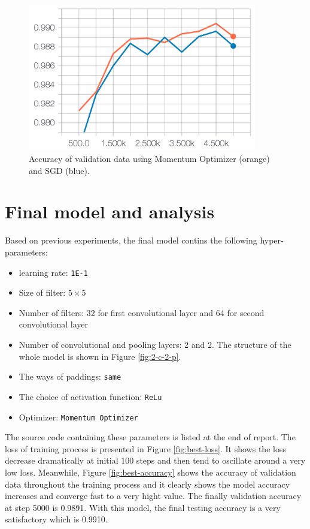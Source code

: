 \documentclass[11pt]{article}
\begin{document}
\begin{figure}[!htb]
   \centering
   \includegraphics[width=10cm]{images/optimizer-accuracy.png} %
   \caption{Accuracy of validation data using Momentum Optimizer (orange) and SGD (blue).}
   \label{fig:momentum-accuracy}
\end{figure}

\clearpage

\section{Final model and analysis}
\label{summary}

Based on previous experiments, the final model contins the following hyper-parameters:

\begin{itemize}
\item
learning rate: {\tt 1E-1} 

\item
Size of filter:  $5\times5$

\item
Number of filters: 32 for first convolutional layer and 64 for second convolutional layer

\item
Number of convolutional and pooling layers: 2 and 2. The structure of the whole model is shown in Figure \ref{fig:2-c-2-p}.

\item
The ways of paddings: {\tt same}

\item
The choice of activation function: {\tt ReLu}

\item
Optimizer: {\tt Momentum Optimizer}
\end{itemize}
The source code containing these parameters is listed at the end of report. The loss of training process is presented in Figure \ref{fig:best-loss}. It shows the loss decrease dramatically at initial 100 steps and then tend to oscillate around a very low loss. Meanwhile, Figure \ref{fig:best-accuracy} shows the accuracy of validation data throughout the training process and it clearly shows the model accuracy increases and converge fast to a very hight value. The finally validation accuracy at step 5000 is 0.9891. With this model, the final testing accuracy is a very satisfactory which is 0.9910.
\end{document}
